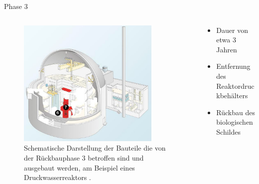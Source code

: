 \begin{frame}{Phase 3}
  \begin{columns}

    \begin{column}{0.48\textwidth}
      \begin{figure}
         \centering
         \includegraphics[width=0.85\textwidth]{./bilder/abbau_phase_3_spiegel.png}
         \caption{Schematische Darstellung der Bauteile die von der Rückbauphase 3 betroffen sind und ausgebaut werden, am Beispiel eines Druckwasserreaktors \cite{abbau_grafik_stade}. }
         \label{ fig: phase_3 }
       \end{figure}
     \end{column}

     \begin{column}{0.48\textwidth}
       \begin{itemize}
         \setlength\itemsep{1.2em}
         \item{ Dauer von etwa 3 Jahren}
         \item{ Entfernung des Reaktordruckbehälters }
         \item{ Rückbau des biologischen Schildes }
       \end{itemize}
     \end{column}

  \end{columns}
\end{frame}



